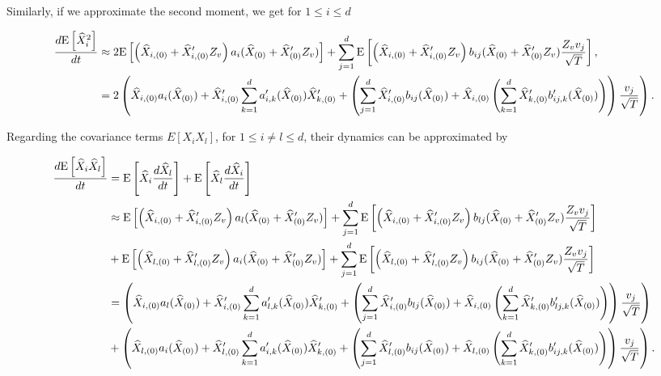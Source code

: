 Similarly, if we approximate the second moment, we get for $1 \le i \le d$
\begin{small}
\begin{align}\label{eq:second_moment_approximation}
\frac{d\mathrm{E}\left[\widehat{X}^2_i\right]}{dt}&\approx 2 \mathrm{E}\left[\left(\widehat{X}_{i,(0)}+\widehat{X}^\prime_{i,(0)} Z_v \right) a_i(\widehat{X}_{(0)}+\widehat{X}^\prime_{(0)} Z_v)\right]+\sum_{j=1}^d \mathrm{E}\left[ \left(\widehat{X}_{i,(0)}+\widehat{X}^\prime_{i,(0)} Z_v \right) b_{ij}(\widehat{X}_{(0)}+\widehat{X}^\prime_{(0)} Z_v)  \frac{Z_v v_j}{\sqrt{T}}\right] , \nonumber\\
&=2 \left( \widehat{X}_{i,(0)} a_i(\widehat{X}_{(0)})+\widehat{X}^\prime_{i,(0)}  \sum_{k=1}^d a_{i,k}^\prime(\widehat{X}_{(0)})\widehat{X}^\prime_{k,(0)}   + \left( \sum_{j=1}^d  \widehat{X}^\prime_{i,(0)} b_{ij}(\widehat{X}_{(0)})+ \widehat{X}_{i,(0)}  \left(\sum_{k=1}^d \widehat{X}^\prime_{k,(0)} b^\prime_{ij,k}(\widehat{X}_{(0)})\right) \right) \frac{ v_j}{\sqrt{T}} \right) .
\end{align}
\end{small}
Regarding the covariance terms $E[X_i X_l]$, for $1 \le i \neq l \le d$, their dynamics can be approximated by
\begin{small}
\begin{align}\label{eq:covariance_dynamcis_approximation}
\frac{d\mathrm{E}\left[\widehat{X}_i \widehat{X}_{l}\right]}{dt}&=\mathrm{E}\left[\widehat{X}_i \frac{d\widehat{X}_l}{dt}\right]+ \mathrm{E}\left[\widehat{X}_l \frac{d\widehat{X}_i}{dt}\right]\nonumber\\
&\approx  \mathrm{E}\left[\left(\widehat{X}_{i,(0)}+\widehat{X}^\prime_{i,(0)} Z_v \right) a_l(\widehat{X}_{(0)}+\widehat{X}^\prime_{(0)} Z_v)\right]+\sum_{j=1}^d \mathrm{E}\left[ \left(\widehat{X}_{i,(0)}+\widehat{X}^\prime_{i,(0)} Z_v \right) b_{lj}(\widehat{X}_{(0)}+\widehat{X}^\prime_{(0)} Z_v)  \frac{Z_v v_j}{\sqrt{T}}\right]  \nonumber\\
&+  \mathrm{E}\left[\left(\widehat{X}_{l,(0)}+\widehat{X}^\prime_{l,(0)} Z_v \right) a_i(\widehat{X}_{(0)}+\widehat{X}^\prime_{(0)} Z_v)\right]+\sum_{j=1}^d \mathrm{E}\left[ \left(\widehat{X}_{l,(0)}+\widehat{X}^\prime_{l,(0)} Z_v \right) b_{ij}(\widehat{X}_{(0)}+\widehat{X}^\prime_{(0)} Z_v)  \frac{Z_v v_j}{\sqrt{T}}\right]  \nonumber\\
&=\left( \widehat{X}_{i,(0)} a_l(\widehat{X}_{(0)})+\widehat{X}^\prime_{i,(0)}  \sum_{k=1}^d a_{l,k}^\prime(\widehat{X}_{(0)})\widehat{X}^\prime_{k,(0)}   + \left( \sum_{j=1}^d  \widehat{X}^\prime_{i,(0)} b_{lj}(\widehat{X}_{(0)})+ \widehat{X}_{i,(0)}  \left(\sum_{k=1}^d \widehat{X}^\prime_{k,(0)} b^\prime_{lj,k}(\widehat{X}_{(0)})\right) \right) \frac{ v_j}{\sqrt{T}} \right) \nonumber\\
&+\left( \widehat{X}_{l,(0)} a_i(\widehat{X}_{(0)})+\widehat{X}^\prime_{l,(0)}  \sum_{k=1}^d a_{i,k}^\prime(\widehat{X}_{(0)})\widehat{X}^\prime_{k,(0)}   + \left( \sum_{j=1}^d  \widehat{X}^\prime_{l,(0)} b_{ij}(\widehat{X}_{(0)})+ \widehat{X}_{l,(0)}  \left(\sum_{k=1}^d \widehat{X}^\prime_{k,(0)} b^\prime_{ij,k}(\widehat{X}_{(0)})\right) \right) \frac{ v_j}{\sqrt{T}} \right) .
\end{align}
\end{small}
